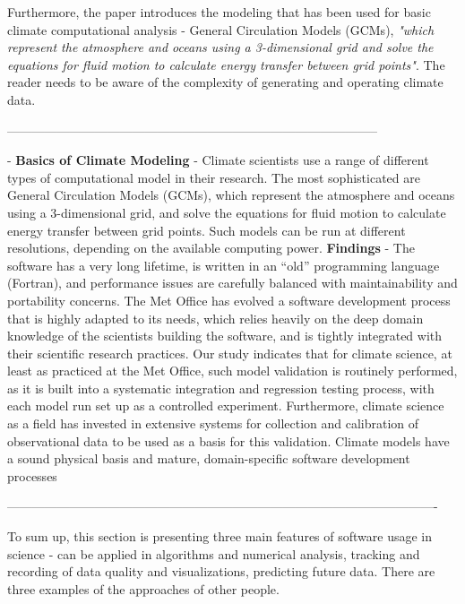 Furthermore, the paper introduces the modeling that has been used for basic climate computational analysis - General Circulation Models (GCMs), \textit{"which represent the atmosphere and oceans using a 3-dimensional grid and solve the equations for fluid motion to calculate energy transfer between grid points"}. \cite{easterbrook2009engineering} The reader needs to be aware of the complexity of generating and operating climate data. 

-----------------------------------------------------------------------------------------

- \textbf{Basics of Climate Modeling} - Climate scientists use a range of different types of computational model in their research. The most sophisticated
are General Circulation Models (GCMs), which represent the atmosphere and oceans using a 3-dimensional grid, and
solve the equations for fluid motion to calculate energy
transfer between grid points. Such models can be run at
different resolutions, depending on the available computing
power.
\textbf{Findings} - The software has a
very long lifetime, is written in an “old” programming language
(Fortran), and performance issues are carefully balanced
with maintainability and portability concerns. The Met Office has evolved a software development process
that is highly adapted to its needs, which relies heavily
on the deep domain knowledge of the scientists building the
software, and is tightly integrated with their scientific research
practices. Our study indicates that for climate science,
at least as practiced at the Met Office, such model validation
is routinely performed, as it is built into a systematic
integration and regression testing process, with each model
run set up as a controlled experiment. Furthermore, climate
science as a field has invested in extensive systems for
collection and calibration of observational data to be used
as a basis for this validation. Climate models have a sound
physical basis and mature, domain-specific software development
processes

-------------------------------------------------------------------------------------------------------

To sum up, this section is presenting three main features of software usage in science - can be applied in algorithms and numerical analysis, tracking and recording of data quality and visualizations, predicting future data. There are three examples of the approaches of other people. 


